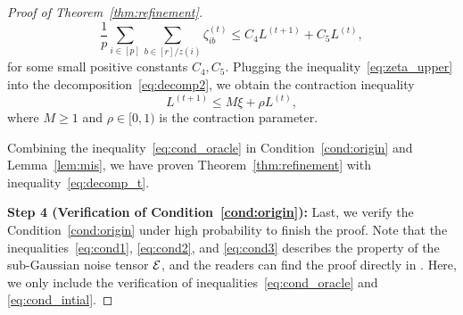 \documentclass[lettersize,onecolumn,journal]{IEEEtran}
\theoremstyle{definition}
\theoremstyle{definition}
\def\fixme#1#2{\textbf{\color{red}[FIXME (#1): #2]}}
\begin{document}
\begin{proof}[Proof of Theorem~\ref{thm:refinement}]
{    \begin{equation}\label{eq:zeta_upper}
        \frac{1}{p}\sum_{i \in [p] }  \sum_{b \in [r]/z(i)}  \zeta_{ib}^{(t)} \leq  C_4 L^{(t+1)}  + C_5 L^{(t)},
    \end{equation}
    for some small positive constants $C_4, C_5$. Plugging the inequality~\eqref{eq:zeta_upper} into the decomposition~\eqref{eq:decomp2}, we obtain the contraction inequality 
    \begin{equation}\label{eq:decomp_t}
          L^{(t+1)} \leq M \xi  + \rho L^{(t)},
    \end{equation}
     where $M \geq 1$ and $\rho \in [0,1)$ is the contraction parameter. 
     
     Combining the inequality~\eqref{eq:cond_oracle} in Condition~\ref{cond:origin} and Lemma~\ref{lem:mis}, we have proven Theorem~\ref{thm:refinement} with inequality~\eqref{eq:decomp_t}.
    }
    
    
    
    
    {\bf Step 4 (Verification of Condition~\ref{cond:origin}):} Last, we verify the Condition~\ref{cond:origin} under high probability to finish the proof. Note that the inequalities~\eqref{eq:cond1}, \eqref{eq:cond2}, and \eqref{eq:cond3} describes the property of the sub-Gaussian noise tensor $\mathcal{E}$, and the readers can find the proof directly in \citet[Step 5, Proof of Theorem 2]{han2020exact}. Here, we only include the verification of inequalities~\eqref{eq:cond_oracle} and \eqref{eq:cond_intial}.
    

\end{proof}
\end{document}

